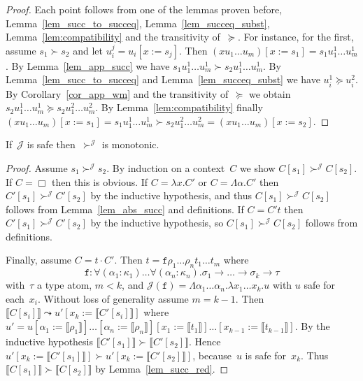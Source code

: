 \documentclass[a4paper,UKenglish,cleveref,autoref,numberwithinsect]{lipics-v2019}
\theoremstyle{definition}
\newcommand{\arrtype}{\rightarrow}
\newcommand{\app}[2]{#1 \cdot #2}
\newcommand{\subst}[2]{#1:=#2}
\newcommand{\abs}[2]{\lambda #1.#2}
\newcommand{\tabs}[2]{\Lambda #1.#2}
\newcommand{\typeinterpret}[1]{\llbracket #1 \rrbracket}
\newcommand{\interpret}[1]{\llbracket #1 \rrbracket}
\newcommand{\Termmap}{\mathcal{J}}
\newcommand{\succinterpret}{\succ^{\Termmap}}
\begin{document}
\begin{proof}
  Each point follows from one of the lemmas proven before,
  Lemma~\ref{lem_succ_to_succeq}, Lemma~\ref{lem_succeq_subst},
  Lemma~\ref{lem:compatibility} and the transitivity of~$\succeq$. For
  instance, for the first, assume $s_1 \succ s_2$ and let
  $u_i^j=u_i[\subst{x}{s_j}]$. Then $(x u_1 \ldots
  u_m)[\subst{x}{s_1}] = s_1 u_1^1 \ldots u_m^1$. By
  Lemma~\ref{lem_app_succ} we have $s_1 u_1^1 \ldots u_m^1 \succ s_2
  u_1^1 \ldots u_m^1$. By Lemma~\ref{lem_succ_to_succeq} and
  Lemma~\ref{lem_succeq_subst} we have $u_i^1 \succeq u_i^2$. By
  Corollary~\ref{cor_app_wm} and the transitivity of~$\succeq$ we
  obtain $s_2 u_1^1 \ldots u_m^1 \succeq s_2 u_1^2 \ldots u_m^2$. By
  Lemma~\ref{lem:compatibility} finally $(x u_1 \ldots
  u_m)[\subst{x}{s_1}] = s_1 u_1^1 \ldots u_m^1 \succ s_2 u_1^2 \ldots
  u_m^2 = (x u_1 \ldots u_m)[\subst{x}{s_2}]$.
\end{proof}

\begin{lemma}\label{lem_succinterpret_monotonic}
  If~$\Termmap$ is safe then~$\succinterpret$ is monotonic.
\end{lemma}

\begin{proof}
  Assume $s_1 \succinterpret s_2$. By induction on
  a context~$C$ we show $C[s_1] \succinterpret C[s_2]$. If $C=\Box$ then
  this is obvious. If $C = \abs{x}{C'}$ or $C = \tabs{\alpha}{C'}$
  then $C'[s_1] \succinterpret C'[s_2]$ by the inductive hypothesis,
  and thus $C[s_1] \succinterpret C[s_2]$ follows from
  Lemma~\ref{lem_abs_succ} and definitions. If $C = C' t$ then
  $C'[s_1] \succinterpret C'[s_2]$ by the inductive hypothesis,
  so $C[s_1] \succinterpret C[s_2]$ follows from definitions.

  Finally, assume $C = \app{t}{C'}$. Then $t = \mathtt{f} \rho_1
  \ldots \rho_n t_1 \ldots t_m$ where
  \[
  \mathtt{f} : \forall (\alpha_1 : \kappa_1) \ldots \forall (\alpha_n
  : \kappa_n) . \sigma_1 \arrtype \ldots \arrtype \sigma_k \arrtype
  \tau
  \]
  with~$\tau$ a type atom, $m < k$, and $\Termmap(\mathtt{f}) =
  \tabs{\alpha_1 \dots \alpha_n}{\abs{x_1 \dots x_k}{u}}$ with $u$
  safe for each~$x_i$. Without loss of generality assume $m=k-1$. Then
  $\interpret{C[s_i]} \leadsto u'[\subst{x_k}{\interpret{C'[s_i]}}]$
  where
  $u'=u[\subst{\alpha_1}{\typeinterpret{\rho_1}}]\ldots[\subst{\alpha_n}{\typeinterpret{\rho_n}}][\subst{x_1}{\interpret{t_1}}]\ldots[\subst{x_{k-1}}{\interpret{t_{k-1}}}]$. By
  the inductive hypothesis $\interpret{C'[s_1]} \succ
  \interpret{C'[s_2]}$. Hence $u'[\subst{x_k}{\interpret{C'[s_1]}}]
  \succ u'[\subst{x_k}{\interpret{C'[s_2]}}]$, because~$u$ is safe
  for~$x_k$. Thus $\interpret{C[s_1]} \succ \interpret{C[s_2]}$ by
  Lemma~\ref{lem_succ_red}.
\end{proof}
\end{document}
